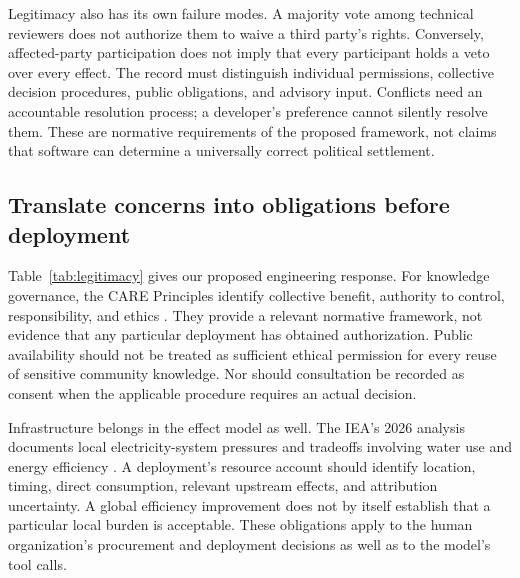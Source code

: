Legitimacy also has its own failure modes. A majority vote among technical reviewers does not authorize them to waive a third party's rights. Conversely, affected-party participation does not imply that every participant holds a veto over every effect. The record must distinguish individual permissions, collective decision procedures, public obligations, and advisory input. Conflicts need an accountable resolution process; a developer's preference cannot silently resolve them. These are normative requirements of the proposed framework, not claims that software can determine a universally correct political settlement.

\subsection{Translate concerns into obligations before deployment}
Table~\ref{tab:legitimacy} gives our proposed engineering response. For knowledge governance, the CARE Principles identify collective benefit, authority to control, responsibility, and ethics \cite{carroll}. They provide a relevant normative framework, not evidence that any particular deployment has obtained authorization. Public availability should not be treated as sufficient ethical permission for every reuse of sensitive community knowledge. Nor should consultation be recorded as consent when the applicable procedure requires an actual decision.

Infrastructure belongs in the effect model as well. The IEA's 2026 analysis documents local electricity-system pressures and tradeoffs involving water use and energy efficiency \cite{iea}. A deployment's resource account should identify location, timing, direct consumption, relevant upstream effects, and attribution uncertainty. A global efficiency improvement does not by itself establish that a particular local burden is acceptable. These obligations apply to the human organization's procurement and deployment decisions as well as to the model's tool calls.

